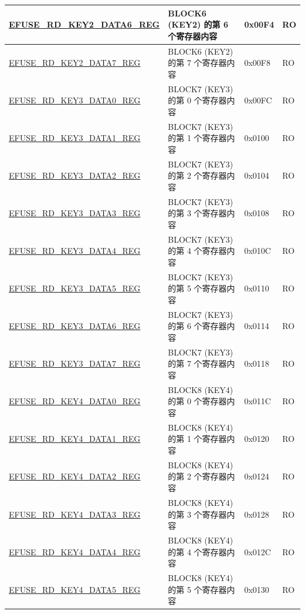 \begin{longtable}{ | p{6.8cm} | p{7cm} | p{1.3cm} | p{1.2cm} | }
\hyperref[regdesc:EFUSERDKEY2DATA6REG]{EFUSE\_RD\_KEY2\_DATA6\_REG} & BLOCK6 (KEY2) 的第 6 个寄存器内容 & 0x00F4 & RO \\ \hline
\hyperref[regdesc:EFUSERDKEY2DATA7REG]{EFUSE\_RD\_KEY2\_DATA7\_REG} & BLOCK6 (KEY2) 的第 7 个寄存器内容 & 0x00F8 & RO \\ \hline
\hyperref[regdesc:EFUSERDKEY3DATA0REG]{EFUSE\_RD\_KEY3\_DATA0\_REG} & BLOCK7 (KEY3) 的第 0 个寄存器内容 & 0x00FC & RO \\ \hline
\hyperref[regdesc:EFUSERDKEY3DATA1REG]{EFUSE\_RD\_KEY3\_DATA1\_REG} & BLOCK7 (KEY3) 的第 1 个寄存器内容 & 0x0100 & RO \\ \hline
\hyperref[regdesc:EFUSERDKEY3DATA2REG]{EFUSE\_RD\_KEY3\_DATA2\_REG} & BLOCK7 (KEY3) 的第 2 个寄存器内容 & 0x0104 & RO \\ \hline
\hyperref[regdesc:EFUSERDKEY3DATA3REG]{EFUSE\_RD\_KEY3\_DATA3\_REG} & BLOCK7 (KEY3) 的第 3 个寄存器内容 & 0x0108 & RO \\ \hline
\hyperref[regdesc:EFUSERDKEY3DATA4REG]{EFUSE\_RD\_KEY3\_DATA4\_REG} & BLOCK7 (KEY3) 的第 4 个寄存器内容 & 0x010C & RO \\ \hline
\hyperref[regdesc:EFUSERDKEY3DATA5REG]{EFUSE\_RD\_KEY3\_DATA5\_REG} & BLOCK7 (KEY3) 的第 5 个寄存器内容 & 0x0110 & RO \\ \hline
\hyperref[regdesc:EFUSERDKEY3DATA6REG]{EFUSE\_RD\_KEY3\_DATA6\_REG} & BLOCK7 (KEY3) 的第 6 个寄存器内容 & 0x0114 & RO \\ \hline
\hyperref[regdesc:EFUSERDKEY3DATA7REG]{EFUSE\_RD\_KEY3\_DATA7\_REG} & BLOCK7 (KEY3) 的第 7 个寄存器内容 & 0x0118 & RO \\ \hline
\hyperref[regdesc:EFUSERDKEY4DATA0REG]{EFUSE\_RD\_KEY4\_DATA0\_REG} & BLOCK8 (KEY4) 的第 0 个寄存器内容 & 0x011C & RO \\ \hline
\hyperref[regdesc:EFUSERDKEY4DATA1REG]{EFUSE\_RD\_KEY4\_DATA1\_REG} & BLOCK8 (KEY4) 的第 1 个寄存器内容 & 0x0120 & RO \\ \hline
\hyperref[regdesc:EFUSERDKEY4DATA2REG]{EFUSE\_RD\_KEY4\_DATA2\_REG} & BLOCK8 (KEY4) 的第 2 个寄存器内容 & 0x0124 & RO \\ \hline
\hyperref[regdesc:EFUSERDKEY4DATA3REG]{EFUSE\_RD\_KEY4\_DATA3\_REG} & BLOCK8 (KEY4) 的第 3 个寄存器内容 & 0x0128 & RO \\ \hline
\hyperref[regdesc:EFUSERDKEY4DATA4REG]{EFUSE\_RD\_KEY4\_DATA4\_REG} & BLOCK8 (KEY4) 的第 4 个寄存器内容 & 0x012C & RO \\ \hline
\hyperref[regdesc:EFUSERDKEY4DATA5REG]{EFUSE\_RD\_KEY4\_DATA5\_REG} & BLOCK8 (KEY4) 的第 5 个寄存器内容 & 0x0130 & RO \\ \hline

\end{longtable}

